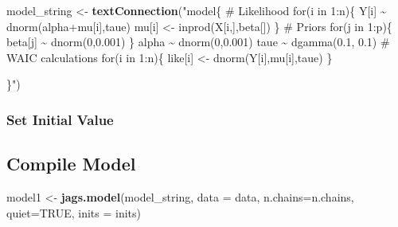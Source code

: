 \documentclass[
]{article}
\newenvironment{Shaded}{\begin{snugshade}}{\end{snugshade}}
\newcommand{\AttributeTok}[1]{\textcolor[rgb]{0.13,0.29,0.53}{#1}}
\newcommand{\ConstantTok}[1]{\textcolor[rgb]{0.56,0.35,0.01}{#1}}
\newcommand{\ControlFlowTok}[1]{\textcolor[rgb]{0.13,0.29,0.53}{\textbf{#1}}}
\newcommand{\DecValTok}[1]{\textcolor[rgb]{0.00,0.00,0.81}{#1}}
\newcommand{\FunctionTok}[1]{\textcolor[rgb]{0.13,0.29,0.53}{\textbf{#1}}}
\newcommand{\NormalTok}[1]{#1}
\newcommand{\OtherTok}[1]{\textcolor[rgb]{0.56,0.35,0.01}{#1}}
\newcommand{\SpecialCharTok}[1]{\textcolor[rgb]{0.81,0.36,0.00}{\textbf{#1}}}
\newcommand{\StringTok}[1]{\textcolor[rgb]{0.31,0.60,0.02}{#1}}
\begin{document}
\begin{Shaded}
\begin{Highlighting}[]
\NormalTok{model\_string }\OtherTok{\textless{}{-}} \FunctionTok{textConnection}\NormalTok{(}\StringTok{"model\{}
\StringTok{  \# Likelihood}
\StringTok{  for(i in 1:n)\{}
\StringTok{    Y[i] \textasciitilde{} dnorm(alpha+mu[i],taue)}
\StringTok{    mu[i] \textless{}{-} inprod(X[i,],beta[])}
\StringTok{  \}}
\StringTok{  }
\StringTok{  \# Priors}
\StringTok{  for(j in 1:p)\{}
\StringTok{    beta[j] \textasciitilde{} dnorm(0,0.001)}
\StringTok{  \}}
\StringTok{  }
\StringTok{  alpha \textasciitilde{} dnorm(0,0.001)}
\StringTok{  taue \textasciitilde{} dgamma(0.1, 0.1)}
\StringTok{  }
\StringTok{  \# WAIC calculations}
\StringTok{  for(i in 1:n)\{}
\StringTok{    like[i] \textless{}{-} dnorm(Y[i],mu[i],taue)}
\StringTok{  \}}

\StringTok{\}"}\NormalTok{)}
\end{Highlighting}
\end{Shaded}

\subsubsection{Set Initial Value}\label{set-initial-value}

\begin{Shaded}
\end{Shaded}

\subsection{Compile Model}\label{compile-model}

\begin{Shaded}
\begin{Highlighting}[]
\NormalTok{model1 }\OtherTok{\textless{}{-}} \FunctionTok{jags.model}\NormalTok{(model\_string, }\AttributeTok{data =}\NormalTok{ data, }\AttributeTok{n.chains=}\NormalTok{n.chains, }\AttributeTok{quiet=}\ConstantTok{TRUE}\NormalTok{, }\AttributeTok{inits =}\NormalTok{ inits)}
\end{Highlighting}
\end{Shaded}
\end{document}
